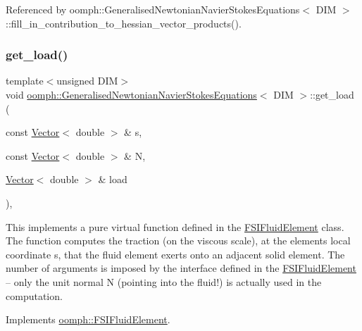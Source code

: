 Referenced by oomph\+::\+Generalised\+Newtonian\+Navier\+Stokes\+Equations$<$ D\+I\+M $>$\+::fill\+\_\+in\+\_\+contribution\+\_\+to\+\_\+hessian\+\_\+vector\+\_\+products().

\mbox{\label{classoomph_1_1GeneralisedNewtonianNavierStokesEquations_ad69fe16e07deef80069fb1b27c19caa1}} 
\subsubsection{\texorpdfstring{get\+\_\+load()}{get\_load()}}
{\footnotesize\ttfamily template$<$unsigned D\+IM$>$ \\
void \hyperlink{classoomph_1_1GeneralisedNewtonianNavierStokesEquations}{oomph\+::\+Generalised\+Newtonian\+Navier\+Stokes\+Equations}$<$ D\+IM $>$\+::get\+\_\+load (\begin{DoxyParamCaption}\item[{const \hyperlink{classoomph_1_1Vector}{Vector}$<$ double $>$ \&}]{s,  }\item[{const \hyperlink{classoomph_1_1Vector}{Vector}$<$ double $>$ \&}]{N,  }\item[{\hyperlink{classoomph_1_1Vector}{Vector}$<$ double $>$ \&}]{load }\end{DoxyParamCaption})\hspace{0.3cm}{\ttfamily [inline]}, {\ttfamily [virtual]}}



This implements a pure virtual function defined in the \hyperlink{classoomph_1_1FSIFluidElement}{F\+S\+I\+Fluid\+Element} class. The function computes the traction (on the viscous scale), at the element\textquotesingle{}s local coordinate s, that the fluid element exerts onto an adjacent solid element. The number of arguments is imposed by the interface defined in the \hyperlink{classoomph_1_1FSIFluidElement}{F\+S\+I\+Fluid\+Element} -- only the unit normal N (pointing into the fluid!) is actually used in the computation. 



Implements \hyperlink{classoomph_1_1FSIFluidElement_acf10e6a716b5e0f743579dfce32e9294}{oomph\+::\+F\+S\+I\+Fluid\+Element}.



